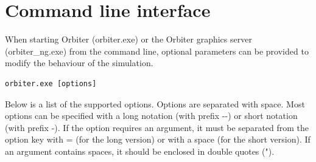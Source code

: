 \documentclass[Orbiter User Manual.tex]{subfiles}
\begin{document}
\section{Command line interface}
When starting Orbiter (orbiter.exe) or the Orbiter graphics server
(orbiter\_ng.exe) from the command line, optional parameters can be provided to
modify the behaviour of the simulation.

\begin{lstlisting}[language=OSFS]
orbiter.exe [options]
\end{lstlisting}

Below is a list of the supported options. Options are separated with space. Most
options can be specified with a long notation (with prefix -{}-) or short
notation (with prefix -). If the option requires an argument, it must be
separated from the option key with = (for the long version) or with a space (for
the short version). If an argument contains spaces, it should be enclosed in
double quotes (").
\end{document}
